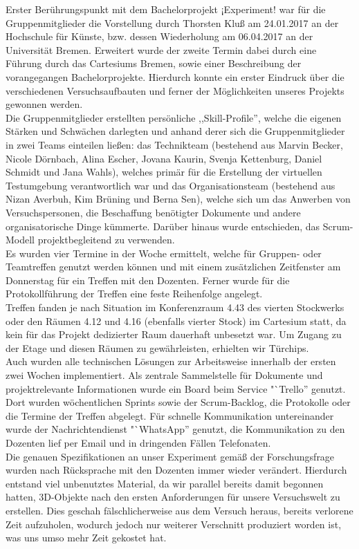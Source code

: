 \documentclass{Bericht}
\begin{document}
		Erster Berührungspunkt mit dem Bachelorprojekt ¡Experiment! war für die Gruppenmitglieder die Vorstellung durch Thorsten Kluß am 24.01.2017 an der Hochschule für Künste, bzw. dessen Wiederholung am 06.04.2017 an der Universität Bremen. Erweitert wurde der zweite Termin dabei durch eine Führung durch das Cartesiums Bremen, sowie einer Beschreibung der vorangegangen Bachelorprojekte. Hierdurch konnte ein erster Eindruck über die verschiedenen Versuchsaufbauten und ferner der Möglichkeiten unseres Projekts gewonnen werden.\\
Die Gruppenmitglieder erstellten persönliche ,,Skill-Profile'', welche die eigenen Stärken und Schwächen darlegten und anhand derer sich die Gruppenmitglieder in zwei Teams einteilen ließen: das Technikteam (bestehend aus Marvin Becker, Nicole Dörnbach, Alina Escher, Jovana Kaurin, Svenja Kettenburg, Daniel Schmidt und Jana Wahls), welches primär für die Erstellung der virtuellen Testumgebung verantwortlich war und das Organisationsteam (bestehend aus Nizan Averbuh, Kim Brüning und Berna Sen), welche sich um das Anwerben von Versuchspersonen, die Beschaffung benötigter Dokumente und andere organisatorische Dinge kümmerte.
Darüber hinaus wurde entschieden, das Scrum-Modell projektbegleitend zu verwenden.\\
Es wurden vier Termine in der Woche ermittelt, welche für Gruppen- oder Teamtreffen genutzt werden können und mit einem zusätzlichen Zeitfenster am Donnerstag für ein Treffen mit den Dozenten. Ferner wurde für die Protokollführung der Treffen eine feste Reihenfolge angelegt.\\
Treffen fanden je nach Situation im Konferenzraum 4.43 des vierten Stockwerks oder den Räumen 4.12 und 4.16 (ebenfalls vierter Stock) im Cartesium statt, da kein für das Projekt dedizierter Raum dauerhaft unbesetzt war. Um Zugang zu der Etage und diesen Räumen zu gewährleisten, erhielten wir Türchips.\\
Auch wurden alle technischen Lösungen zur Arbeitsweise innerhalb der ersten zwei Wochen implementiert. Als zentrale Sammelstelle für Dokumente und projektrelevante Informationen wurde ein Board beim Service "`Trello'' genutzt. Dort wurden wöchentlichen Sprints sowie der Scrum-Backlog, die Protokolle oder die Termine der Treffen abgelegt. Für schnelle Kommunikation untereinander wurde der Nachrichtendienst "`WhatsApp'' genutzt, die Kommunikation zu den Dozenten lief per Email und in dringenden Fällen Telefonaten.\\
		Die genauen Spezifikationen an unser Experiment gemäß der Forschungsfrage wurden nach Rücksprache mit den Dozenten immer wieder verändert. Hierdurch entstand viel unbenutztes Material, da wir parallel bereits damit begonnen hatten, 3D-Objekte nach den ersten Anforderungen für unsere Versuchswelt zu erstellen. Dies geschah fälschlicherweise aus dem Versuch heraus, bereits verlorene Zeit aufzuholen, wodurch jedoch nur weiterer Verschnitt produziert worden ist, was uns umso mehr Zeit gekostet hat.\\
\end{document}
